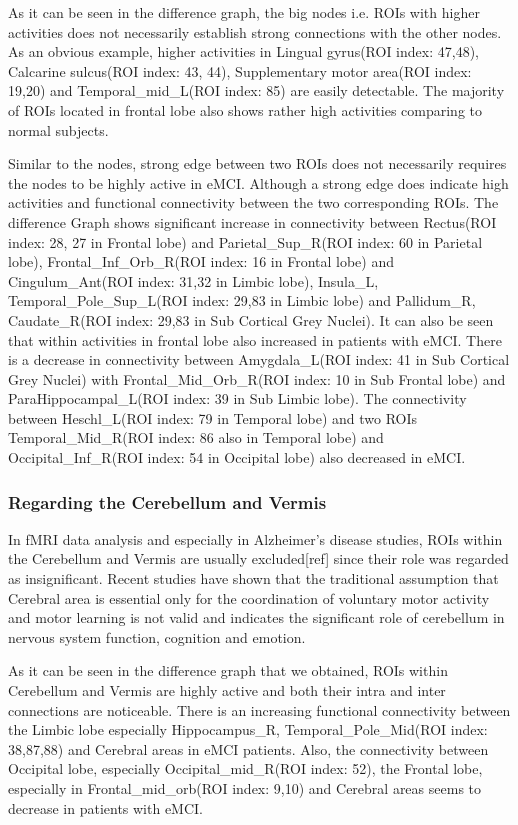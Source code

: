 \documentclass[journal]{IEEEtran}
\begin{document}
{	As it can be seen in the difference graph, the big nodes i.e. ROIs with higher activities does not necessarily establish strong connections with the other nodes. As an obvious example, higher activities in Lingual gyrus(ROI index: 47,48)\cite{r24,r25}, Calcarine sulcus(ROI index: 43, 44)\cite{r26,r27}, Supplementary motor area(ROI index: 19,20)\cite{r27,r28} and Temporal\_mid\_L(ROI index: 85)\cite{r29} are easily detectable. The majority of ROIs located in frontal lobe also shows rather high activities comparing to normal subjects\cite{r31,r30}.
	
	Similar to the nodes, strong edge between two ROIs does not necessarily requires the nodes to be highly active in eMCI. Although a strong edge does indicate high activities and functional connectivity between the two corresponding ROIs. The difference Graph shows significant increase in connectivity between 
	Rectus(ROI index: 28, 27 in Frontal lobe) and 
	Parietal\_Sup\_R(ROI index: 60 in Parietal lobe),
	Frontal\_Inf\_Orb\_R(ROI index: 16 in Frontal lobe) and
	Cingulum\_Ant(ROI index: 31,32 in Limbic lobe), 
	Insula\_L, Temporal\_Pole\_Sup\_L(ROI index: 29,83 in Limbic lobe) and
	Pallidum\_R, Caudate\_R(ROI index: 29,83 in Sub Cortical Grey Nuclei). It can also be seen that within activities in frontal lobe also increased in patients with eMCI. There is a decrease in connectivity between Amygdala\_L(ROI index: 41 in Sub Cortical Grey Nuclei) with Frontal\_Mid\_Orb\_R(ROI index: 10 in Sub Frontal lobe) and ParaHippocampal\_L(ROI index: 39 in Sub Limbic lobe). The connectivity between Heschl\_L(ROI index: 79 in Temporal lobe) and two ROIs Temporal\_Mid\_R(ROI index: 86 also in Temporal lobe) and Occipital\_Inf\_R(ROI index: 54 in Occipital lobe) also decreased in eMCI.  
	
	\subsubsection*{Regarding the Cerebellum and Vermis}
	In fMRI data analysis and especially in Alzheimer's disease studies, ROIs within the Cerebellum and Vermis are usually excluded[ref] since their role was regarded as insignificant. Recent studies have shown that the traditional assumption that Cerebral area is essential only for the coordination of voluntary motor activity and motor learning is not valid and indicates the significant role of cerebellum in nervous system function, cognition and emotion\cite{r32}. 
	
	As it can be seen in the difference graph that we obtained, ROIs within Cerebellum and Vermis are highly active and both their intra and inter connections are noticeable. There is an increasing functional connectivity between the Limbic lobe especially 
	Hippocampus\_R, Temporal\_Pole\_Mid(ROI index: 38,87,88)
	and Cerebral areas in eMCI patients. Also, the connectivity between Occipital lobe, especially Occipital\_mid\_R(ROI index: 52), the Frontal lobe, especially in Frontal\_mid\_orb(ROI index: 9,10) and Cerebral areas seems to decrease in patients with eMCI.
	
}
\end{document}

